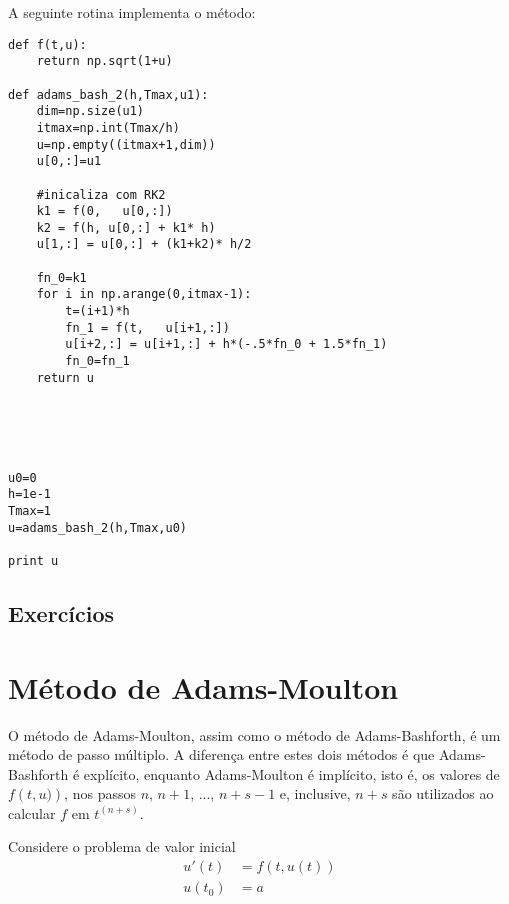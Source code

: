 \ifispython
A seguinte rotina implementa o método:
\begin{verbatim}
def f(t,u):
	return np.sqrt(1+u)

def adams_bash_2(h,Tmax,u1):
	dim=np.size(u1)
	itmax=np.int(Tmax/h)
	u=np.empty((itmax+1,dim))
	u[0,:]=u1

	#inicaliza com RK2
	k1 = f(0,   u[0,:])
	k2 = f(h, u[0,:] + k1* h)
	u[1,:] = u[0,:] + (k1+k2)* h/2

	fn_0=k1
	for i in np.arange(0,itmax-1):
		t=(i+1)*h
		fn_1 = f(t,   u[i+1,:])
		u[i+2,:] = u[i+1,:] + h*(-.5*fn_0 + 1.5*fn_1)
		fn_0=fn_1
	return u





u0=0
h=1e-1
Tmax=1
u=adams_bash_2(h,Tmax,u0)

print u
\end{verbatim}

\fi

\emconstrucao

\subsection*{Exercícios}

\emconstrucao

\section{Método de Adams-Moulton}\label{pvi:Adams_Moulton}
O método de Adams-Moulton, assim como o método de Adams-Bashforth, é um método de passo múltiplo. A diferença entre estes dois métodos é que Adams-Bashforth é explícito, enquanto Adams-Moulton é implícito, isto é, os valores de $f\left(t,u)\right)$, nos passos $n$, $n+1$, ..., $n+s-1$ e, inclusive, $n+s$ são utilizados ao calcular $f$ em $t^{(n+s)}$.

Considere o problema de valor inicial
\begin{eqnarray*}
  u'(t) &= f(t,u(t)) \\
  u(t_0) &= a
\end{eqnarray*}

